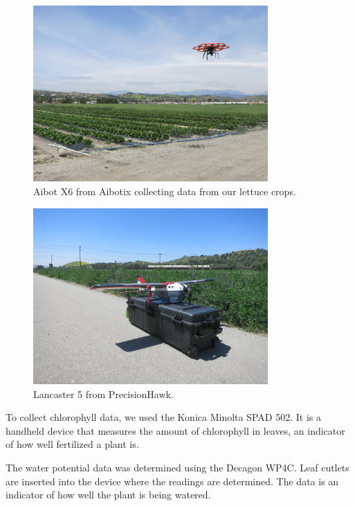 \begin{figure}
    \centering
    \includegraphics[width=0.8\textwidth]{images/aibotx6.JPG}
    \caption{Aibot X6 from Aibotix collecting data from our lettuce crops.}
    \label{aibotx6}
\end{figure}
\begin{figure}
    \centering
    \includegraphics[width=0.8\textwidth]{images/lancaster5.JPG}
    \caption{Lancaster 5 from PrecisionHawk.}
    \label{lancaster5}
\end{figure}


To collect chlorophyll data, we used the Konica Minolta SPAD 502. It is a handheld device that measures the amount of chlorophyll in leaves, an indicator of how well fertilized a plant is.

The water potential data was determined using the Decagon WP4C. Leaf cutlets are inserted into the device where the readings are determined. The data is an indicator of how well the plant is being watered.



